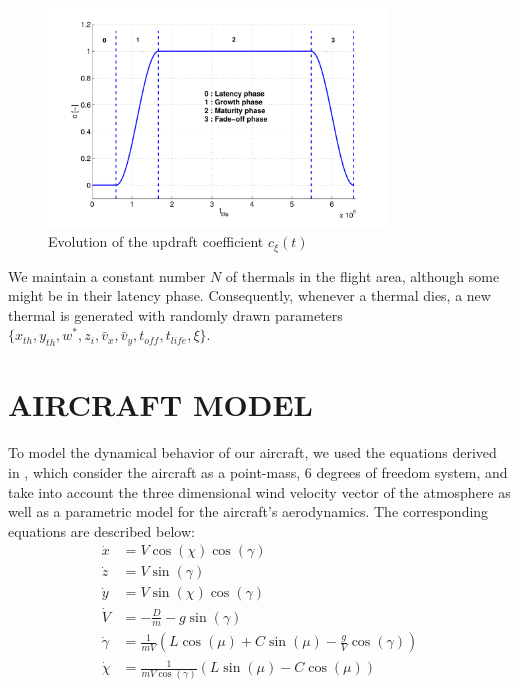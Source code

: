 \documentclass{jfpda}
\begin{document}
\begin{figure}%
\begin{center}
 \includegraphics[width=9cm]{img/lifeCycle.pdf}
\end{center}
\caption{Evolution of the updraft coefficient $c_\xi(t)$}
\label{fig:life_cycle}
\end{figure}

We maintain a constant number $N$ of thermals in the flight area, although some might be in their latency phase. Consequently, whenever a thermal dies, a new thermal is generated with randomly drawn parameters $\{x_{th},y_{th}, w^*, z_i, \bar{v}_x, \bar{v}_y, t_{\textit{off}}, t_{\textit{life}}, \xi \}$.


\section{AIRCRAFT MODEL}
\label{sec:aircraft}

To model the dynamical behavior of our aircraft, we used the equations derived in \cite{dynamic}, which consider the aircraft as a point-mass, 6 degrees of freedom system, and take into account the three dimensional wind velocity vector of the atmosphere as well as a parametric model for the aircraft's aerodynamics. The corresponding equations are described below:
\begin{align*}
\dot{x} &= V \cos(\chi)\cos(\gamma)\\
\dot{z} &= V \sin(\gamma)\\
\dot{y} &= V \sin(\chi)\cos(\gamma)\\
\dot{V} &= -\frac{D}{m}-g \sin(\gamma)\\
\dot{\gamma} &= \frac{1}{mV}\left(L\cos(\mu) + C \sin(\mu) - \frac{g}{V}\cos(\gamma)\right)\\
\dot{\chi} &= \frac{1}{mV \cos(\gamma)}\left(L\sin\left(\mu\right)-C \cos\left(\mu\right)\right)
\end{align*}
\end{document}
